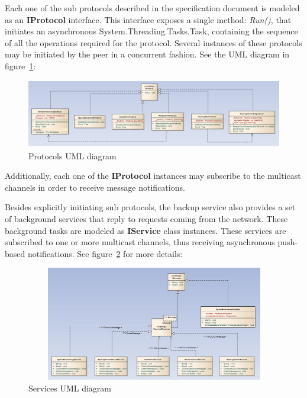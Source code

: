 \documentclass[a4paper]{article}
\begin{document}
Each one of the sub protocols described in the specification document is modeled as an \textbf{IProtocol} interface. This interface exposes a single method: \textit{Run()}, that initiates an asynchronous System.Threading.Tasks.Task, containing the sequence of all the operations required for the protocol. Several instances of these protocols may be initiated by the peer in a concurrent fashion. See the UML diagram in figure~\ref{fig:protocols}:

\begin{figure}[h!]
\begin{center}
\includegraphics[height=3cm, width=12cm]{figures/protocolsUML.PNG}
\caption{Protocols UML diagram}
\label{fig:protocols}
\end{center}
\end{figure}

Additionally, each one of the \textbf{IProtocol} instances may subscribe to the multicast channels in order to receive message notifications.

Besides explicitly initiating sub protocols, the backup service also provides a set of background services that reply to requests coming from the network. These background tasks are modeled as \textbf{IService} class instances. These services are subscribed to one or more multicast channels, thus receiving asynchronous push-based notifications. See figure~\ref{fig:services} for more details:

\begin{figure}[h!]
\begin{center}
\includegraphics[height=5cm, width=12cm]{figures/servicesUML.PNG}
\caption{Services UML diagram}
\label{fig:services}
\end{center}
\end{figure}
\end{document}
